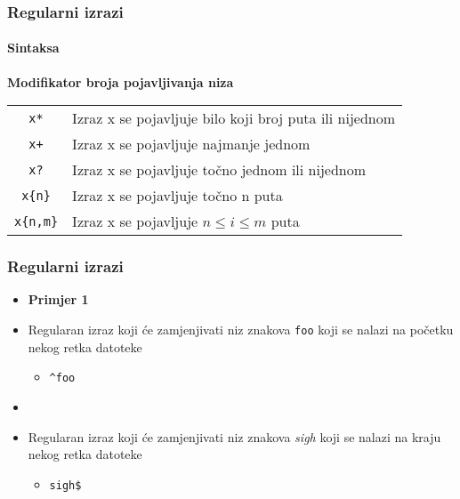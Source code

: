 \documentclass[table,usenames,dvipsnames]{beamer}
\newcommand{\shell}[1]{\texttt{#1}}
\begin{document}
\begin{frame}[t]
\frametitle{Regularni izrazi}
\framesubtitle{Sintaksa}
\textbf{Modifikator broja pojavljivanja niza}
\begin{table}[h]
\begin{tabular}{c l}
  \shell{x*} & Izraz x se pojavljuje bilo koji broj puta ili nijednom\\
  \shell{x+} & Izraz x se pojavljuje najmanje jednom \\
  \shell{x?} & Izraz x se pojavljuje točno jednom ili nijednom \\
  \shell{x\{n\}} & Izraz x se pojavljuje točno n puta \\
  \shell{x\{n,m\}} & Izraz x se pojavljuje $n \le i \le m$ puta
\end{tabular}
\end{table}
\end{frame}
  
\begin{frame}[t]
\frametitle{Regularni izrazi}
\begin{itemize}
  \item \textbf{Primjer 1}
  \item[] Regularan izraz koji će zamjenjivati niz znakova \shell{foo} koji se nalazi na početku nekog retka datoteke
  \begin{itemize}
    \item[] \shell{\textasciicircum{}foo}
  \end{itemize}
  \item[]
  \item[] Regularan izraz koji će zamjenjivati niz znakova \emph{sigh}
        koji se nalazi na kraju nekog retka datoteke
  \begin{itemize}
    \item[] \shell{sigh\$}
  \end{itemize}
\end{itemize}
\end{frame}
\end{document}
